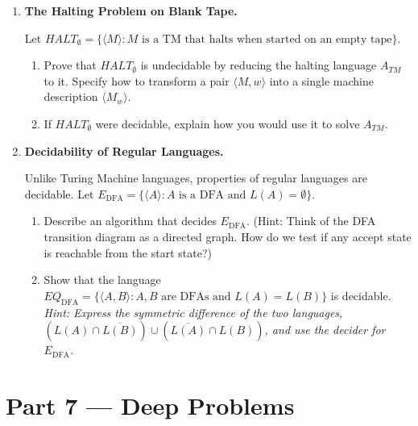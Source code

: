 \documentclass[12pt, a4paper]{book}
\begin{document}
\begin{problembox}
\begin{enumerate}[label=\textbf{P\arabic*.}]
  \item \textbf{The Halting Problem on Blank Tape.}
  
        Let $HALT_{\emptyset} = \{\langle M \rangle : M \text{ is a TM that halts when started on an empty tape}\}$.
        \begin{enumerate}[label=(\alph*)]
          \item Prove that $HALT_{\emptyset}$ is undecidable by reducing the halting language $A_{TM}$ to it.
                Specify how to transform a pair $\langle M, w \rangle$ into a single machine description $\langle M_w \rangle$.
          \item If $HALT_{\emptyset}$ were decidable, explain how you would use it to solve $A_{TM}$.
        \end{enumerate}

  \item \textbf{Decidability of Regular Languages.}
  
        Unlike Turing Machine languages, properties of regular languages are decidable.
        Let $E_{\text{DFA}} = \{\langle A \rangle : A \text{ is a DFA and } L(A) = \emptyset\}$.
        \begin{enumerate}[label=(\alph*)]
          \item Describe an algorithm that decides $E_{\text{DFA}}$. (Hint: Think of the DFA transition diagram as a directed graph. How do we test if any accept state is reachable from the start state?)
          \item Show that the language $EQ_{\text{DFA}} = \{\langle A, B \rangle : A, B \text{ are DFAs and } L(A) = L(B)\}$ is decidable.
                \textit{Hint: Express the symmetric difference of the two languages, $(L(A) \cap \overline{L(B)}) \cup (\overline{L(A)} \cap L(B))$, and use the decider for $E_{\text{DFA}}$.}
        \end{enumerate}
\end{enumerate}
\end{problembox}

\newpage

\section{Part 7 --- Deep Problems}
\end{document}
